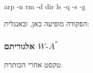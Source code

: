 \documentclass[
]{article}
\newenvironment{Shaded}{}{}
\newcommand{\AttributeTok}[1]{\textcolor[rgb]{0.49,0.56,0.16}{#1}}
\newcommand{\ExtensionTok}[1]{#1}
\newcommand{\FunctionTok}[1]{\textcolor[rgb]{0.02,0.16,0.49}{#1}}
\newcommand{\NormalTok}[1]{#1}
\begin{document}
\begin{english}

\begin{Shaded}
\begin{Highlighting}[]
\ExtensionTok{arp} \AttributeTok{{-}n}
\FunctionTok{rm} \AttributeTok{{-}d}\NormalTok{ dir}
\FunctionTok{ls} \AttributeTok{{-}q} \AttributeTok{{-}s} \AttributeTok{{-}g}
\end{Highlighting}
\end{Shaded}

\end{english}

הפקודה  מופיעה כאן, ובאנגלית:

\subsubsection{\texorpdfstring{אלגוריתם
\(W\text{-}A^*\)}{אלגוריתם W\textbackslash text\{-\}A\^{}*}}\label{ux5d0ux5dcux5d2ux5d5ux5e8ux5d9ux5eaux5dd-wtext-a}

טקסט אחרי הכותרת.
\end{document}
